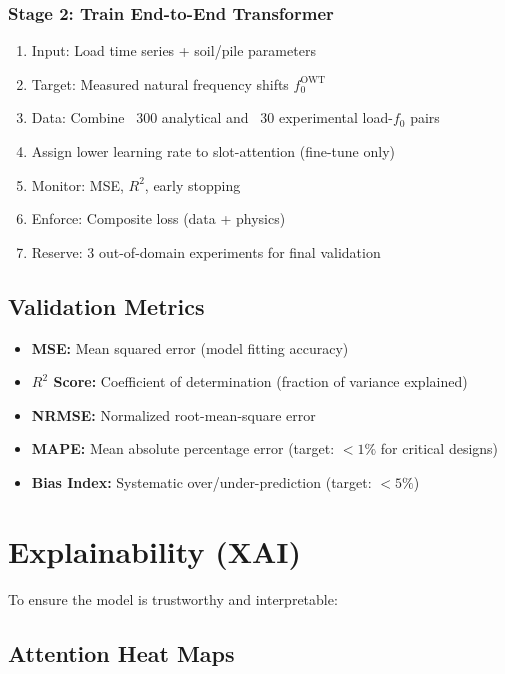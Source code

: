 \documentclass[11pt,a4paper]{article}
\begin{document}
\subsubsection{Stage 2: Train End-to-End Transformer}
\begin{enumerate}
  \item Input: Load time series + soil/pile parameters
  \item Target: Measured natural frequency shifts $f_0^{\text{OWT}}$
  \item Data: Combine ~300 analytical and ~30 experimental load-$f_0$ pairs
  \item Assign lower learning rate to slot-attention (fine-tune only)
  \item Monitor: MSE, $R^2$, early stopping
  \item Enforce: Composite loss (data + physics)
  \item Reserve: 3 out-of-domain experiments for final validation
\end{enumerate}

\subsection{Validation Metrics}

\begin{itemize}
  \item \textbf{MSE:} Mean squared error (model fitting accuracy)
  \item \textbf{$R^2$ Score:} Coefficient of determination (fraction of variance explained)
  \item \textbf{NRMSE:} Normalized root-mean-square error
  \item \textbf{MAPE:} Mean absolute percentage error (target: $< 1\%$ for critical designs)
  \item \textbf{Bias Index:} Systematic over/under-prediction (target: $< 5\%$)
\end{itemize}

\section{Explainability (XAI)}

To ensure the model is trustworthy and interpretable:

\subsection{Attention Heat Maps}
\end{document}
